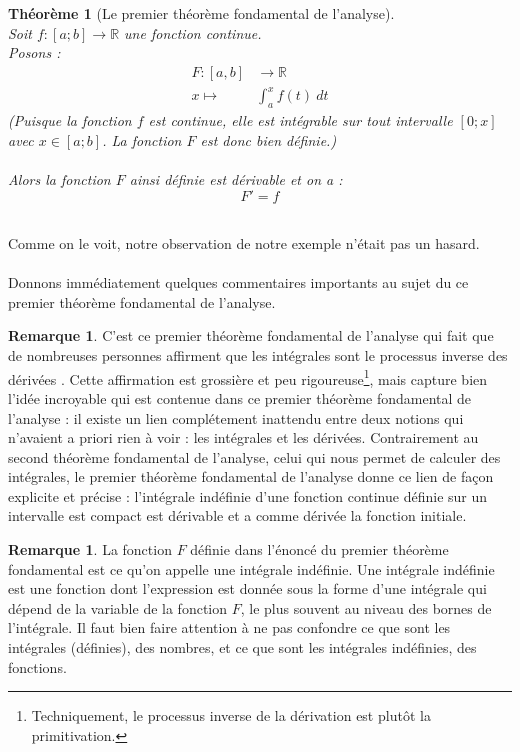 \documentclass[a4paper,fontsize=13pt]{scrreprt}
\theoremstyle{plain}
\newtheorem{thé}[subsection]{Théorème}
\theoremstyle{definition}
\newtheorem{rema}[subsection]{Remarque}
\newcommand{\rr}{\mathbb{R}}
\begin{document}
\begin{large}
\begin{thé}[Le premier théorème fondamental de l'analyse] ~\\
Soit $f : [a;b] \to \rr$ une fonction continue. \\
Posons :
\begin{align*}
F : [a,b] &\to \rr \\
x \mapsto& \int_{a}^{x} f(t)~dt
\end{align*}
(Puisque la fonction $f$ est continue, elle est intégrable sur tout intervalle $[0;x]$ avec $x \in [a;b]$. La fonction $F$ est donc bien définie.) \\
~\\
Alors la fonction $F$ ainsi définie est dérivable et on a :
$$F'=f$$
\end{thé}
\end{large}~\\
Comme on le voit, notre observation de notre exemple n'était pas un hasard. \\~\\
Donnons immédiatement quelques commentaires importants au sujet du ce premier théorème fondamental de l'analyse.
\newpage
\begin{rema}
C'est ce premier théorème fondamental de l'analyse qui fait que de nombreuses personnes affirment que \og les intégrales sont le processus inverse des dérivées \fg{}. Cette affirmation est grossière et peu rigoureuse\footnote{Techniquement, le processus inverse de la dérivation est plutôt la primitivation.}, mais capture bien l'idée incroyable qui est contenue dans ce premier théorème fondamental de l'analyse : il existe un lien complétement inattendu entre deux notions qui n'avaient a priori rien à voir : les intégrales et les dérivées. Contrairement au second théorème fondamental de l'analyse, celui qui nous permet de calculer des intégrales, le premier théorème fondamental de l'analyse donne ce lien de façon explicite et précise : l'intégrale indéfinie d'une fonction continue définie sur un intervalle est compact est dérivable et a comme dérivée la fonction initiale.
\end{rema}
\vfill
\begin{rema}
La fonction $F$ définie dans l'énoncé du premier théorème fondamental est ce qu'on appelle une intégrale indéfinie. Une intégrale indéfinie est une fonction dont l'expression est donnée sous la forme d'une intégrale qui dépend de la variable de la fonction $F$, le plus souvent au niveau des bornes de l'intégrale. Il faut bien faire attention à ne pas confondre ce que sont les intégrales (définies), des nombres, et ce que sont les intégrales indéfinies, des fonctions.
\end{rema}
\end{document}
